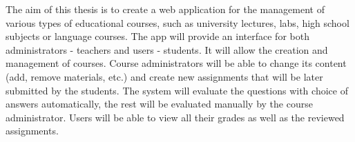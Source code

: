 \documentclass[12pt]{report}
\begin{document}

The aim of this thesis is to create a web application for the management of various types of educational courses, such as university lectures, labs, high school subjects or language courses. The app will provide an interface for both administrators - teachers and users - students. 
It will allow the creation and management of courses. Course administrators will be able to change its content (add, remove materials, etc.) and create new assignments that will be later submitted by the students. 
The system will evaluate the questions with choice of answers automatically, the rest will be evaluated manually by the course administrator. 
Users will be able to view all their grades as well as the reviewed assignments.
\end{document}
